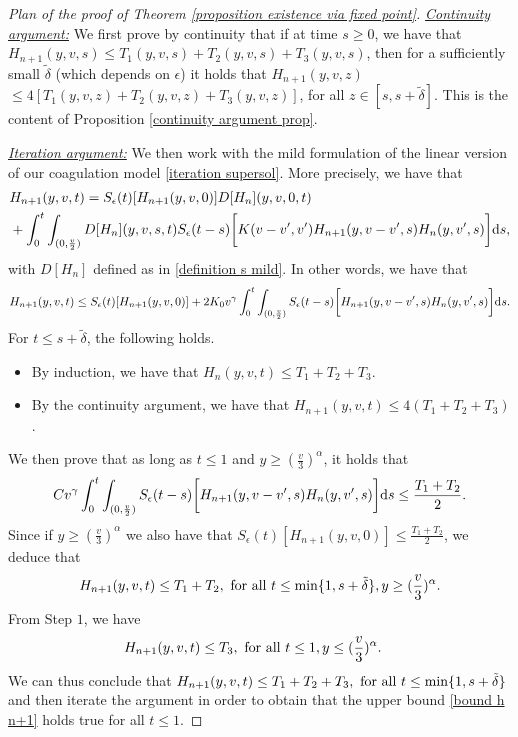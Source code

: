 \documentclass[11pt]{article}
\numberwithin{equation}{section}
\newcommand{\der}{\textup{d}}
\begin{document}
\begin{proof}[Plan of the proof of Theorem \ref{proposition existence via fixed point}]
\textit{\underline{Continuity argument:}} We first prove by continuity that if at time $s\geq 0$, we have that $H_{n+1}(y,v,s)\leq T_{1}(y,v,s)+T_{2}(y,v,s)+T_{3}(y,v,s)$, then for a sufficiently small $\tilde{\delta}$ (which depends on $\epsilon$) it holds that $H_{n+1}(y,v,z)$ $\leq 4[T_{1}(y,v,z)+T_{2}(y,v,z)+T_{3}(y,v,z)]$, for all $z\in[s,s+\tilde{\delta}]$. This is the content of Proposition \ref{continuity argument prop}.

\textit{\underline{Iteration argument:}} We then work with the mild formulation of the linear version of our coagulation model \eqref{iteration supersol}. More precisely, we have that
\begin{align}\label{mild form iteration in n}
&H_{n+1}(y,v,t)=S_{\epsilon}(t)[H_{n+1}(y,v,0) ] D[H_{n}](y,v,0,t)\\
&+\int_{0}^{t}\int_{(0,\frac{v}{2})}D[H_{n}](y,v,s,t)
S_{\epsilon}(t-s)\bigg[K(v-v',v')H_{n+1}(y,v-v',s) H_{n}(y,v',s)\bigg]\der s,\nonumber 
\end{align}
with $D[H_{n}]$ defined as in \eqref{definition s mild}. In other words, we have that
\begin{align*}
H_{n+1}(y,v,t)\leq S_{\epsilon}(t)[H_{n+1}(y,v,0) ] +2K_{0}v^{\gamma}\int_{0}^{t}\int_{(0,\frac{v}{2})}
S_{\epsilon}(t-s)\bigg[H_{n+1}(y,v-v',s) H_{n}(y,v',s)\bigg]\der s.\nonumber 
\end{align*}
For $t\leq s+\tilde{\delta}$, the following holds.
\begin{itemize}
    \item By induction, we have that $H_{n}(y,v,t)\leq T_{1}+T_{2}+T_{3}$.
    \item By the continuity argument, we have that $H_{n+1}(y,v,t)\leq 4(T_{1}+T_{2}+T_{3})$.
\end{itemize}We then prove that as long as $t\leq 1$ and $y\geq (\frac{v}{3})^{\alpha}$, it holds that
\begin{align*}
Cv^{\gamma}\int_{0}^{t}\int_{(0,\frac{v}{2})}
S_{\epsilon}(t-s)\bigg[H_{n+1}(y,v-v',s) H_{n}(y,v',s)\bigg]\der s\leq \frac{T_{1}+T_{2}}{2}.
\end{align*}
Since if  $y\geq (\frac{v}{3})^{\alpha}$ we also have that $S_{\epsilon}(t)[H_{n+1}(y,v,0) ] \leq \frac{T_{1}+T_{2}}{2}$, we deduce that
\begin{align}\label{bound h n+1}
    H_{n+1}(y,v,t)\leq T_{1}+T_{2}, \textup{ for all } t\leq \min\{1,s+\tilde{\delta}\},  y\geq (\frac{v}{3})^{\alpha}.
\end{align}
From Step $1$, we have 
\begin{align*}
    H_{n+1}(y,v,t)&\leq T_{3}, \textup{ for all } t\leq 1,  y\leq (\frac{v}{3})^{\alpha}.
\end{align*}
We can thus conclude that $H_{n+1}(y,v,t)\leq T_{1}+T_{2}+T_{3}, \textup{ for all } t\leq \min\{1,s+\tilde{\delta}\}$ and then iterate the argument in order to obtain that the upper bound \eqref{bound h n+1} holds true for all $t\leq 1$. 


\end{proof}
\end{document}
